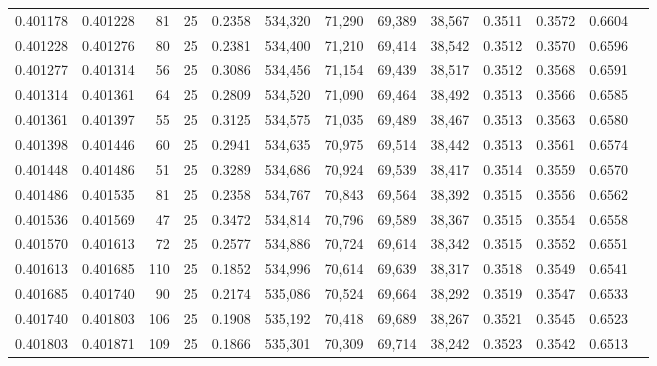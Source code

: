 \begin{tabular}{rrrrrrrrrrrrr}
0.401178 & 0.401228 &    81 &  25 &                                     0.2358 & 534,320 &  71,290 &  69,389 &  38,567 & 0.3511 & 0.3572 & 0.6604 \\
0.401228 & 0.401276 &    80 &  25 &                                     0.2381 & 534,400 &  71,210 &  69,414 &  38,542 & 0.3512 & 0.3570 & 0.6596 \\
0.401277 & 0.401314 &    56 &  25 &                                     0.3086 & 534,456 &  71,154 &  69,439 &  38,517 & 0.3512 & 0.3568 & 0.6591 \\
0.401314 & 0.401361 &    64 &  25 &                                     0.2809 & 534,520 &  71,090 &  69,464 &  38,492 & 0.3513 & 0.3566 & 0.6585 \\
0.401361 & 0.401397 &    55 &  25 &                                     0.3125 & 534,575 &  71,035 &  69,489 &  38,467 & 0.3513 & 0.3563 & 0.6580 \\
0.401398 & 0.401446 &    60 &  25 &                                     0.2941 & 534,635 &  70,975 &  69,514 &  38,442 & 0.3513 & 0.3561 & 0.6574 \\
0.401448 & 0.401486 &    51 &  25 &                                     0.3289 & 534,686 &  70,924 &  69,539 &  38,417 & 0.3514 & 0.3559 & 0.6570 \\
0.401486 & 0.401535 &    81 &  25 &                                     0.2358 & 534,767 &  70,843 &  69,564 &  38,392 & 0.3515 & 0.3556 & 0.6562 \\
0.401536 & 0.401569 &    47 &  25 &                                     0.3472 & 534,814 &  70,796 &  69,589 &  38,367 & 0.3515 & 0.3554 & 0.6558 \\
0.401570 & 0.401613 &    72 &  25 &                                     0.2577 & 534,886 &  70,724 &  69,614 &  38,342 & 0.3515 & 0.3552 & 0.6551 \\
0.401613 & 0.401685 &   110 &  25 &                                     0.1852 & 534,996 &  70,614 &  69,639 &  38,317 & 0.3518 & 0.3549 & 0.6541 \\
0.401685 & 0.401740 &    90 &  25 &                                     0.2174 & 535,086 &  70,524 &  69,664 &  38,292 & 0.3519 & 0.3547 & 0.6533 \\
0.401740 & 0.401803 &   106 &  25 &                                     0.1908 & 535,192 &  70,418 &  69,689 &  38,267 & 0.3521 & 0.3545 & 0.6523 \\
0.401803 & 0.401871 &   109 &  25 &                                     0.1866 & 535,301 &  70,309 &  69,714 &  38,242 & 0.3523 & 0.3542 & 0.6513 \\

\end{tabular}
